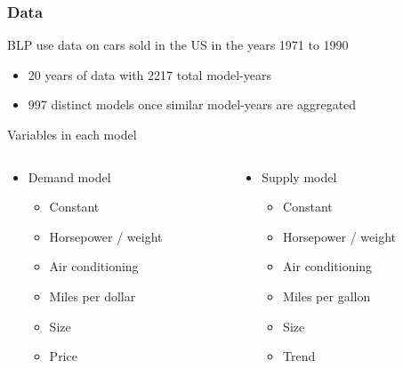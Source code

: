 \documentclass{beamer}
\begin{document}
\begin{frame}\frametitle{Data}
    BLP use data on cars sold in the US in the years 1971 to 1990
    \begin{itemize}
        \item 20 years of data with 2217 total model-years
        \item 997 distinct models once similar model-years are aggregated
    \end{itemize}
    \vspace{2ex}
    Variables in each model \\
    \begin{columns}
        \begin{column}{0.5\textwidth}
            \begin{itemize}
                \item Demand model
                \begin{itemize}
                    \item Constant
                    \item Horsepower / weight
                    \item Air conditioning
                    \item Miles per dollar
                    \item Size
                    \item Price
                \end{itemize}
            \end{itemize}
        \end{column}
        \begin{column}{0.5\textwidth}
            \begin{itemize}
                \item Supply model
                \begin{itemize}
                    \item Constant
                    \item Horsepower / weight
                    \item Air conditioning
                    \item Miles per gallon
                    \item Size
                    \item Trend
                \end{itemize}
            \end{itemize}
        \end{column}
    \end{columns}
\end{frame}
\end{document}

